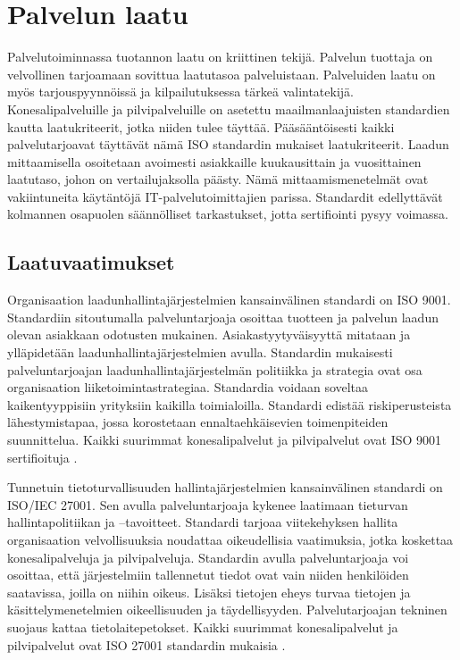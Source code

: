 \chapter{Palvelun laatu\label{laatu}}
Palvelutoiminnassa tuotannon laatu on kriittinen tekijä. Palvelun tuottaja on velvollinen tarjoamaan sovittua laatutasoa palveluistaan. Palveluiden laatu on myös tarjouspyynnöissä ja kilpailutuksessa tärkeä valintatekijä. Konesalipalveluille ja pilvipalveluille on asetettu maailmanlaajuisten standardien kautta laatukriteerit, jotka niiden tulee täyttää. Pääsääntöisesti kaikki palvelutarjoavat täyttävät nämä ISO standardin mukaiset laatukriteerit. Laadun mittaamisella osoitetaan avoimesti asiakkaille kuukausittain ja vuosittainen laatutaso, johon on vertailujaksolla päästy. Nämä mittaamismenetelmät ovat vakiintuneita käytäntöjä IT-palvelutoimittajien parissa. Standardit edellyttävät kolmannen osapuolen säännölliset tarkastukset, jotta sertifiointi pysyy voimassa.
\section{Laatuvaatimukset}
Organisaation laadunhallintajärjestelmien kansainvälinen standardi on ISO 9001. Standardiin sitoutumalla palveluntarjoaja osoittaa tuotteen ja palvelun laadun olevan asiakkaan odotusten mukainen. Asiakastyytyväisyyttä mitataan ja ylläpidetään laadunhallintajärjestelmien avulla. Standardin mukaisesti palveluntarjoajan laadunhallintajärjestelmän politiikka ja strategia ovat osa organisaation liiketoimintastrategiaa. Standardia voidaan soveltaa kaikentyyppisiin yrityksiin kaikilla toimialoilla. Standardi edistää riskiperusteista lähestymistapaa, jossa korostetaan ennaltaehkäisevien toimenpiteiden suunnittelua. Kaikki suurimmat konesalipalvelut ja pilvipalvelut ovat ISO 9001 sertifioituja \citep{borenstein2011cloud} \citep{iso9001}.

Tunnetuin tietoturvallisuuden hallintajärjestelmien kansainvälinen standardi on ISO/IEC 27001. Sen avulla palveluntarjoaja kykenee laatimaan tieturvan hallintapolitiikan ja –tavoitteet. Standardi tarjoaa viitekehyksen hallita organisaation velvollisuuksia noudattaa oikeudellisia vaatimuksia, jotka koskettaa konesalipalveluja ja pilvipalveluja. Standardin avulla palveluntarjoaja voi osoittaa, että järjestelmiin tallennetut tiedot ovat vain niiden henkilöiden saatavissa, joilla on niihin oikeus. Lisäksi tietojen eheys turvaa tietojen ja käsittelymenetelmien oikeellisuuden ja täydellisyyden. Palvelutarjoajan tekninen suojaus kattaa tietolaitepetokset. Kaikki suurimmat konesalipalvelut ja pilvipalvelut ovat ISO 27001 standardin mukaisia \citep{pattern} \citep{iso27001}.

